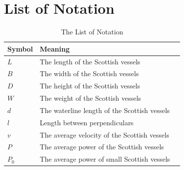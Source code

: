\documentclass{mcmthesis}
\begin{document}
\section{List of Notation}

\begin{center}
\begin{longtable}{p{}p{}m{}}
\caption{The List of Notation}\\
\hline
Symbol& Meaning \\
\hline

$L$      & The length of the Scottish vessels \\
$B$      & The width of the Scottish vessels 
                                                          \\
$D$     & The height of the Scottish vessels 
                                                        \\
$W$     & The weight of the Scottish vessels 
                                                        \\
$d$      & The   waterline length of the Scottish vessels \\
$l$       & Length between perpendiculars                                                           \\
$v$      & The average velocity  of the Scottish vessels                                            \\
$P$      & The average power of the Scottish vessels\\
$P_0$      & The average power of small Scottish vessels\\    
                                     

\end{longtable}
\end{center}
\end{document}
